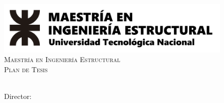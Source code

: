 \begin{titlepage}
\thispagestyle{empty} %
\begin{center}
	\begin{minipage}{0.75\linewidth}
		\centering
		\includegraphics[width=0.85\textwidth]{Figuras/logo_maestria} \\[2cm]
		{\scshape\Large Maestría en Ingeniería Estructural} \\[2cm]
		{\scshape\Large Plan de Tesis} \\[0.5cm]	     
		{\huge\bfseries \TituloTesis}
	\end{minipage}
\end{center} \vspace{3cm}
\begin{center}
	\begin{minipage}{0.75\linewidth}
		\centering
	    {\LARGE\bfseries \Tesista} \\[2cm]
	    {\large Director: \Director}\\
	\end{minipage}
\end{center} \vfill
\begin{center}
	\begin{minipage}{1\linewidth}	    
	\end{minipage}
\end{center}
\end{titlepage}